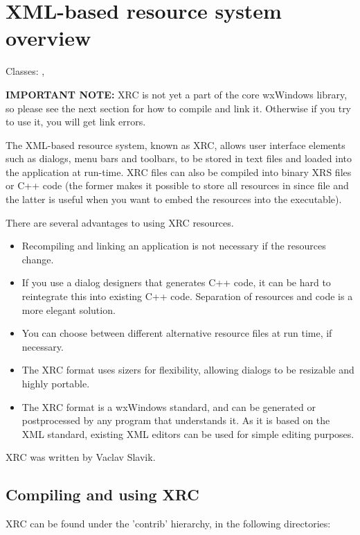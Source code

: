 \section{XML-based resource system overview}\label{xrcoverview}

Classes: , 

{\bf IMPORTANT NOTE:} XRC is not yet a part of the core wxWindows library, so
please see the next section for how to compile and link it. Otherwise if you
try to use it, you will get link errors.

The XML-based resource system, known as XRC, allows user interface elements such as
dialogs, menu bars and toolbars, to be stored in text files and loaded into
the application at run-time. XRC files can also be compiled into binary XRS files or C++
code (the former makes it possible to store all resources in since file and the latter
is useful when you want to embed the resources into the executable).

There are several advantages to using XRC resources.

\begin{itemize}\itemsep=0pt
\item Recompiling and linking an application is not necessary if the
resources change.
\item If you use a dialog designers that generates C++ code, it can be hard
to reintegrate this into existing C++ code. Separation of resources and code
is a more elegant solution.
\item You can choose between different alternative resource files at run time, if necessary.
\item The XRC format uses sizers for flexibility, allowing dialogs to be resizable
and highly portable.
\item The XRC format is a wxWindows standard,
and can be generated or postprocessed by any program that understands it. As it is based
on the XML standard, existing XML editors can be used for simple editing purposes.
\end{itemize}

XRC was written by Vaclav Slavik.

\subsection{Compiling and using XRC}\label{compilingxrc}

XRC can be found under the 'contrib' hierarchy, in the following directories:

